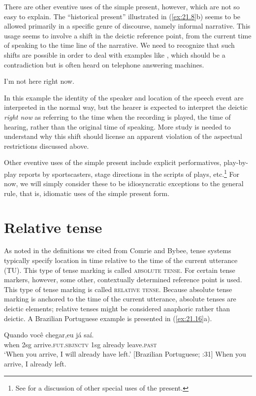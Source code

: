 There are other eventive uses of the simple present, however, which are not so easy to explain. The “historical present” illustrated in (\ref{ex:21.8}b) seems to be allowed primarily in a specific genre of discourse, namely informal narrative. This usage seems to involve a shift in the deictic reference point, from the current time of speaking to the time line of the narrative. We need to recognize that such shifts are possible in order to deal with examples like , which should be a contradiction but is often heard on telephone answering machines.


\ea \label{ex:21.15}
I’m not here right now.
\z


In this example the identity of the speaker and location of the speech event are interpreted in the normal way, but the hearer is expected to interpret the deictic \textit{right now} as referring to the time when the recording is played, the time of hearing, rather than the original time of speaking. More study is needed to understand why this shift should license an apparent violation of the aspectual restrictions discussed above.



Other eventive uses of the simple present include explicit performatives, play-by-play reports by sportscasters, stage directions in the scripts of plays, etc.\footnote{See \citet{Klein2009} for a discussion of other special uses of the present.} For now, we will simply consider these to be idiosyncratic exceptions to the general rule, that is, idiomatic uses of the simple present form.


\section{Relative tense}\label{sec:21.4}

As noted in the definitions we cited from Comrie and Bybee, tense systems typically specify location in time relative to the time of the current utterance (TU). This type of tense marking is called \textsc{absolute tense}. For certain tense markers, however, some other, contextually determined reference point is used. This type of tense marking is called \textsc{relative tense}. Because absolute tense marking is anchored to the time of the current utterance, absolute tenses are deictic elements; relative tenses might be considered anaphoric rather than deictic. A Brazilian Portuguese example is presented in (\ref{ex:21.16}a).


\ea \label{ex:21.16}
\ea  \gll Quando  você  chegar,\footnotemark  eu  já  saí.\\
when  2sg  arrive.\textsc{fut.sbjnctv}  1sg  already  leave.\textsc{past}\\
\glt ‘When you arrive, I will already have left.’   [Brazilian Portuguese; \citealt{Comrie1985}:31]
\ex   *When you arrive, I already left.
\z \z
{}


